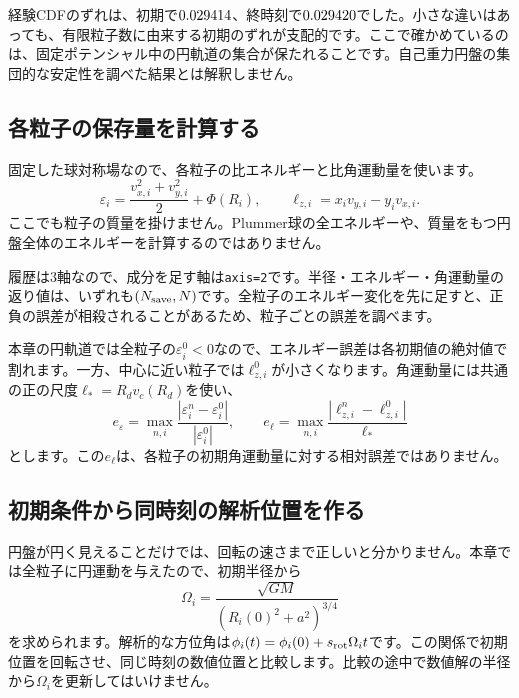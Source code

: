 経験CDFのずれは、初期で$0.029414$、終時刻で$0.029420$でした。小さな違いはあっても、有限粒子数に由来する初期のずれが支配的です。ここで確かめているのは、固定ポテンシャル中の円軌道の集合が保たれることです。自己重力円盤の集団的な安定性を調べた結果とは解釈しません。

\subsection{各粒子の保存量を計算する}
固定した球対称場なので、各粒子の比エネルギーと比角運動量を使います。
\begin{equation}
\varepsilon_i=\frac{v_{x,i}^2+v_{y,i}^2}{2}+\Phi(R_i),\qquad
\ell_{z,i}=x_i v_{y,i}-y_i v_{x,i}.
\label{eq:ch4-invariants}
\end{equation}
ここでも粒子の質量を掛けません。Plummer球の全エネルギーや、質量をもつ円盤全体のエネルギーを計算するのではありません。

履歴は3軸なので、成分を足す軸は\texttt{axis=2}です。半径・エネルギー・角運動量の返り値は、いずれも$(N_{\rm save},N)$です。全粒子のエネルギー変化を先に足すと、正負の誤差が相殺されることがあるため、粒子ごとの誤差を調べます。

本章の円軌道では全粒子の$\varepsilon_i^0<0$なので、エネルギー誤差は各初期値の絶対値で割れます。一方、中心に近い粒子では$\ell_{z,i}^0$が小さくなります。角運動量には共通の正の尺度$\ell_*=R_dv_c(R_d)$を使い、
\begin{equation}
e_\varepsilon=\max_{n,i}\frac{|\varepsilon_i^n-\varepsilon_i^0|}{|\varepsilon_i^0|},\qquad
e_\ell=\max_{n,i}\frac{|\ell_{z,i}^n-\ell_{z,i}^0|}{\ell_*}
\label{eq:ch4-conservation-errors}
\end{equation}
とします。この$e_\ell$は、各粒子の初期角運動量に対する相対誤差ではありません。

\subsection{初期条件から同時刻の解析位置を作る}
円盤が円く見えることだけでは、回転の速さまで正しいと分かりません。本章では全粒子に円運動を与えたので、初期半径から
\begin{equation}
\Omega_i=\frac{\sqrt{GM}}{(R_i(0)^2+a^2)^{3/4}}
\label{eq:ch4-omega}
\end{equation}
を求められます。解析的な方位角は$\phi_i(t)=\phi_i(0)+s_{\rm rot}\Omega_it$です。この関係で初期位置を回転させ、同じ時刻の数値位置と比較します。比較の途中で数値解の半径から$\Omega_i$を更新してはいけません。

